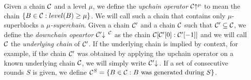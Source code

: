 Given a chain $\mathcal{C}$ and a level $\mu$, we define the \textit{upchain
operator} $\mathcal{C}\negthickspace\uparrow^\mu$ to mean the chain $\{B \in \mathcal{C}: level(B) \geq
\mu\}$. We will call such a chain that contains only $\mu$-superblocks a
$\mu$\textit{-superchain}. Given a chain $\mathcal{C}'$ and a chain $\mathcal{C}$ such
that $\mathcal{C}' \subseteq \mathcal{C}$, we define the \textit{downchain opeartor}
$\mathcal{C}'\negthickspace\downarrow\,^{\mathcal{C}}$ as the chain $\mathcal{C}[\mathcal{C}'[0]:\mathcal{C}'[-1]]$ and we
will call $\mathcal{C}$ the \textit{underlying chain} of $\mathcal{C}'$. If the underlying
chain is implied by context, for example, if the chain $\mathcal{C}'$ was obtained by
applying the upchain operator on a known underlying chain $\mathcal{C}$, we will
simply write $\mathcal{C}'\negthickspace\downarrow\,$. If a set of consecutive rounds $S$ is given,
we define $\mathcal{C}^S = \{B \in \mathcal{C}: B \textnormal{ was generated during } S\}$.

